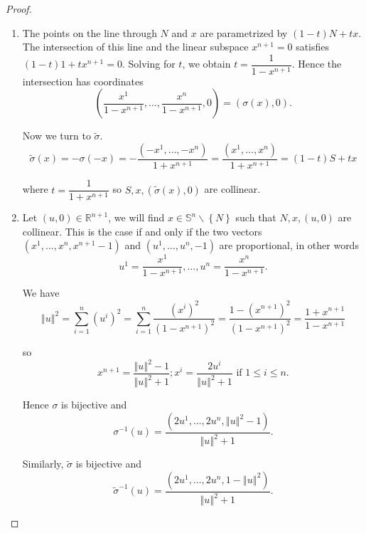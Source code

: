 \begin{proof}
    \begin{enumerate}[itemsep=0pt,label={(\alph*)}]
        \item The points on the line through \( N \) and \( x \) are parametrized by \( (1 - t) N + t x \). The intersection of this line and the linear subspace \( x^{n+1} = 0 \) satisfies \( (1 - t) 1 + t x^{n+1} = 0 \). Solving for \( t \), we obtain \( t = \dfrac{1}{1 - x^{n+1}} \). Hence the intersection has coordinates
              \[
                  \left( \dfrac{x^{1}}{1 - x^{n+1}}, \ldots, \dfrac{x^{n}}{1 - x^{n+1}}, 0 \right) = (\sigma(x), 0).
              \]

              Now we turn to \( \widetilde{\sigma} \).
              \[
                  \widetilde{\sigma}(x) = -\sigma(-x) = -\dfrac{(-x^{1}, \ldots, -x^{n})}{1 + x^{n+1}} = \dfrac{(x^{1}, \ldots, x^{n})}{1 + x^{n+1}} = (1 - t) S + tx
              \]

              where \( t = \dfrac{1}{1 + x^{n+1}} \) so \( S, x, (\widetilde{\sigma}(x), 0) \) are collinear.
        \item Let \( (u, 0) \in \mathbb{R}^{n+1} \), we will find \( x \in \mathbb{S}^{n} \smallsetminus \left\{ N \right\} \) such that \( N, x, (u, 0) \) are collinear. This is the case if and only if the two vectors \( (x^{1}, \ldots, x^{n}, x^{n+1} - 1) \) and \( (u^{1}, \ldots, u^{n}, -1) \) are proportional, in other words
              \[
                  u^{1} = \dfrac{x^{1}}{1 - x^{n+1}}, \ldots, u^{n} = \dfrac{x^{n}}{1 - x^{n+1}}.
              \]

              We have
              \[
                  {\left\Vert u \right\Vert}^{2} = \sum_{i=1}^{n} {(u^{i})}^{2} = \sum_{i=1}^{n} \dfrac{{(x^{i})}^{2}}{{(1 - x^{n+1})}^{2}} = \dfrac{1 - {(x^{n+1})}^{2}}{{(1 - x^{n+1})}^{2}} = \dfrac{1 + x^{n+1}}{1 - x^{n+1}}
              \]

              so
              \[
                  x^{n+1} = \dfrac{{\left\Vert u \right\Vert}^{2} - 1}{{\left\Vert u \right\Vert}^{2} + 1}; x^{i} = \dfrac{2u^{i}}{{\left\Vert u \right\Vert}^{2} + 1} \text{ if } 1 \le i \le n.
              \]

              Hence \( \sigma \) is bijective and
              \[
                  \sigma^{-1}(u) = \dfrac{(2u^{1}, \ldots, 2u^{n}, {\left\Vert u \right\Vert}^{2} - 1)}{{\left\Vert u \right\Vert}^{2} + 1}.
              \]

              Similarly, \( \widetilde{\sigma} \) is bijective and
              \[
                  \widetilde{\sigma}^{-1}(u) = \dfrac{(2u^{1}, \ldots, 2u^{n}, 1 - {\left\Vert u \right\Vert}^{2})}{{\left\Vert u \right\Vert}^{2} + 1}.
              \]


\end{enumerate}
\end{proof}
